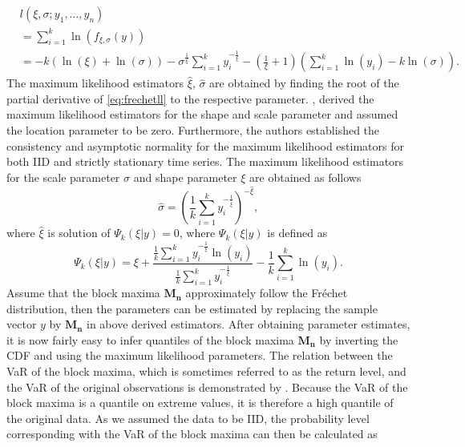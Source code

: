 \documentclass[a4paper,12pt]{article}
\theoremstyle{plain}
\begin{document}
\begin{equation}
\begin{split}
    & l\left(\xi,\sigma;y_1, \dots, y_n\right) \\
    & = \sum_{i=1}^{k}\ln{\left(f_{\xi,\sigma}\left(y\right)\right)} \\
    & = -k\left(\ln{\left(\xi\right)}+\ln{\left(\sigma\right)}\right)-\sigma^{\frac{1}{\xi}}\sum_{i=1}^k y_i^{-\frac{1}{\xi}} - \left(\frac{1}{\xi}+1\right)\left(\sum_{i=1}^k \ln{\left(y_i\right)} - k\ln{\left(\sigma\right)}\right).
    \label{eq:frechetll}
\end{split}
\end{equation}
The maximum likelihood estimators $\hat{\xi}$, $\hat{\sigma}$ are obtained by finding the root of the partial derivative of \eqref{eq:frechetll} to the respective parameter. , derived the maximum likelihood estimators for the shape and scale parameter and assumed the location parameter to be zero. Furthermore, the authors established the consistency and asymptotic normality for the maximum likelihood estimators for both IID and strictly stationary time series. The maximum likelihood estimators for the scale parameter $\sigma$ and shape parameter $\xi$ are obtained as follows
\begin{equation}
    \hat{\sigma} = \left(\frac{1}{k}\sum^k_{i=1}y_i^{-\frac{1}{\hat{\xi}}}\right)^{-\hat{\xi}},
    \label{eq:bmmlsigma}
\end{equation}
\noindent where $\hat{\xi}$ is solution of $\Psi_k\left(\xi|y\right)=0$, where $\Psi_k\left(\xi|y\right)$ is defined as
\begin{equation}
        \Psi_k\left(\xi|y\right) = \xi + \frac{\frac{1}{k}\sum^k_{i=1}y_i^{-\frac{1}{\xi}}\ln{\left(y_i\right)}}{\frac{1}{k}\sum^k_{i=1}y_i^{-\frac{1}{\xi}}} - \frac{1}{k}\sum^k_{i=1}\ln{\left(y_i\right)}.
        \label{eq:bmmlshape}
\end{equation}
Assume that the block maxima $\bm{M_n}$ approximately follow the Fr\'echet distribution, then the parameters can be estimated by replacing the sample vector $y$ by $\bm{M_n}$ in above derived estimators. After obtaining parameter estimates, it is now fairly easy to infer quantiles of the block maxima $\bm{M_n}$ by inverting the CDF and using the maximum likelihood parameters. The relation between the VaR of the block maxima, which is sometimes referred to as the return level, and the VaR of the original observations is demonstrated by . Because the VaR of the block maxima is a quantile on extreme values, it is therefore a high quantile of the original data. As we assumed the data to be IID, the probability level corresponding with the VaR of the block maxima can then be calculated as
\end{document}
